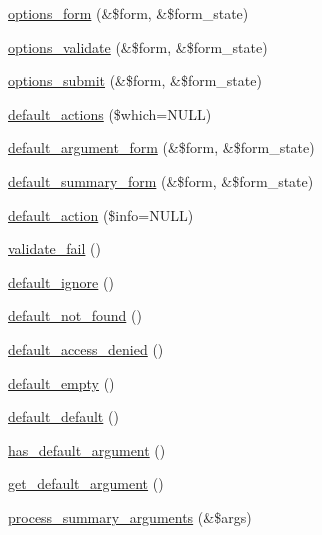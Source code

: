 \begin{DoxyCompactItemize}
\item 
\hyperlink{classviews__handler__argument_a44f015a0d527983ae6df2689f66b2c24}{options\_\-form} (\&\$form, \&\$form\_\-state)
\item 
\hyperlink{classviews__handler__argument_a0d5e9e31111cfc98588f59fc9d031cc6}{options\_\-validate} (\&\$form, \&\$form\_\-state)
\item 
\hyperlink{classviews__handler__argument_ad9c8c040a47bd9910dbce31e8932b882}{options\_\-submit} (\&\$form, \&\$form\_\-state)
\item 
\hyperlink{classviews__handler__argument_abf38ef334b6e18e0aa43e5a829e3ce33}{default\_\-actions} (\$which=NULL)
\item 
\hyperlink{classviews__handler__argument_a830cb037bee2daa385618a60d01c0dd1}{default\_\-argument\_\-form} (\&\$form, \&\$form\_\-state)
\item 
\hyperlink{classviews__handler__argument_a2153c4a0abfeafc8b610513367088355}{default\_\-summary\_\-form} (\&\$form, \&\$form\_\-state)
\item 
\hyperlink{classviews__handler__argument_a6c4d14fd0c639184162d7d684a2e04a6}{default\_\-action} (\$info=NULL)
\item 
\hyperlink{classviews__handler__argument_ac180c7b4e4f53bdf39272ac17591f13a}{validate\_\-fail} ()
\item 
\hyperlink{classviews__handler__argument_add70e34213524feae0efaf05235ef60e}{default\_\-ignore} ()
\item 
\hyperlink{classviews__handler__argument_a86d899382f0c2cb16177d18b553827af}{default\_\-not\_\-found} ()
\item 
\hyperlink{classviews__handler__argument_ae2921604aa74d8050c68938d6e467472}{default\_\-access\_\-denied} ()
\item 
\hyperlink{classviews__handler__argument_a0648192a05a597bd19ff2ba6e5bdaa91}{default\_\-empty} ()
\item 
\hyperlink{classviews__handler__argument_a15f51f60c6183e6975d0aef857ad7f42}{default\_\-default} ()
\item 
\hyperlink{classviews__handler__argument_abfc79c3b710372accd054b73bbb7b373}{has\_\-default\_\-argument} ()
\item 
\hyperlink{classviews__handler__argument_a4362d110d5cb6c7aa46770974289dbaf}{get\_\-default\_\-argument} ()
\item 
\hyperlink{classviews__handler__argument_a682108cbe43452b6567e3b1fd1fe897e}{process\_\-summary\_\-arguments} (\&\$args)
\item 

\end{DoxyCompactItemize}
